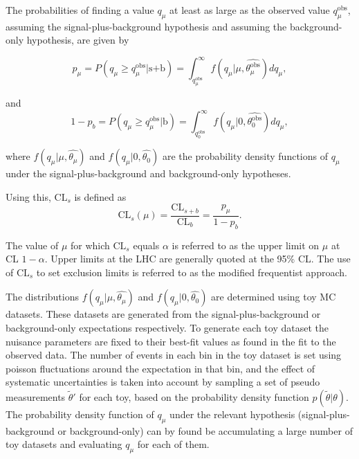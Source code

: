 The probabilities of finding a value $q_{\mu}$ at least as large as the observed value $q_{\mu}^{\text{obs}}$, assuming the signal-plus-background hypothesis
and assuming the background-only hypothesis, are given by

\begin{equation}\label{eqn:hhh_pvaluesig}
p_{\mu} = P(q_{\mu} \geq q_{\mu}^{\text{obs}} | \text{s+b}) = \int_{q_{\mu}^{\text{obs}}}^{\infty} f(q_{\mu} | \mu,\hat{\theta_{\mu}^{\text{obs}}}) dq_{\mu},
\end{equation}

and 
\begin{equation}\label{eqn:hhh_pvaluebkg}
1-p_b = P(q_{\mu} \geq q_{\mu}^{\text{obs}} | \text{b}) = \int_{q_{0}^{\text{obs}}}^{\infty} f(q_{\mu} | 0,\hat{\theta_{0}^{\text{obs}}}) dq_{\mu} ,
\end{equation}

where $f(q_{\mu}|\mu,\hat{\theta_{\mu}})$ and $f(q_{\mu} | 0,\hat{\theta_0})$ are the probability density functions of $q_{\mu}$ under
the signal-plus-background and background-only hypotheses.

Using this, $\text{CL}_s$ is defined as
\begin{equation}\label{eqn:hhh_cls}
\text{CL}_s(\mu) = \frac{\text{CL}_{s+b}}{\text{CL}_b} = \frac{p_{\mu}}{1-p_b}.
\end{equation}

The value of $\mu$ for which $\text{CL}_s$ equals $\alpha$ is referred to as the upper limit on $\mu$ at
\acf{CL} $1-\alpha$. Upper limits at the LHC are generally
quoted at the 95\% \ac{CL}. %
The use of $\text{CL}_s$ to set exclusion limits is referred to as the modified frequentist approach\cite{CLS}.

The distributions $f(q_{\mu}|\mu,\hat{\theta_{\mu}})$ and $f(q_{\mu}|0,\hat{\theta_0})$ are determined
using toy MC datasets. These datasets are generated from the signal-plus-background or background-only expectations respectively. 
To generate each toy dataset the nuisance parameters are fixed to their best-fit values as found in the fit to the observed data.
The number of events in each bin in the toy dataset is set using poisson fluctuations around the expectation in that bin, and the effect of
systematic uncertainties is taken into account by sampling a set of pseudo measurements $\tilde{\theta}'$ for each toy, based on the 
probability density function $p(\tilde{\theta}|\theta)$.
The probability density function of $q_{\mu}$ under the relevant hypothesis (signal-plus-background or background-only)
can by found be accumulating a large number of toy datasets and evaluating $q_{\mu}$ for each of them.

